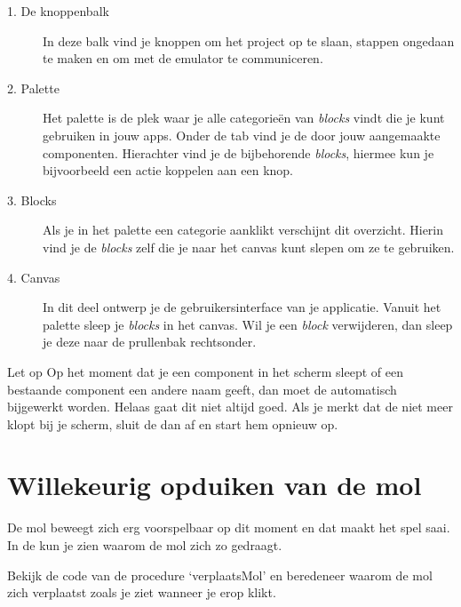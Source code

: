 \begin{description}
  \item[1. De knoppenbalk] In deze balk vind je knoppen om het project op te slaan, stappen ongedaan te maken en om met de emulator te communiceren.
  \item[2. Palette] Het palette is de plek waar je alle categorie\"en van \emph{blocks} vindt die je kunt gebruiken in jouw apps. Onder de tab  vind je de door jouw aangemaakte componenten. Hierachter vind je de bijbehorende \emph{blocks}, hiermee kun je bijvoorbeeld een actie koppelen aan een knop.
  \item[3. Blocks] Als je in het palette een categorie aanklikt verschijnt dit overzicht. Hierin vind je de \emph{blocks} zelf die je naar het canvas kunt slepen om ze te gebruiken.
  \item[4. Canvas] In dit deel ontwerp je de gebruikersinterface van je applicatie. Vanuit het palette sleep je \emph{blocks} in het canvas. Wil je een \emph{block} verwijderen, dan sleep je deze naar de prullenbak rechtsonder.
\end{description}

\pagebreak
\begin{derivation}{Let op}
Op het moment dat je een component in het  scherm sleept of een bestaande component een andere naam geeft, dan moet de  automatisch bijgewerkt worden. Helaas gaat dit niet altijd goed. Als je merkt dat de  niet meer klopt bij je  scherm, sluit de  dan af en start hem opnieuw op.
\end{derivation}

\section{Willekeurig opduiken van de mol}
De mol beweegt zich erg voorspelbaar op dit moment en dat maakt het spel saai. In de  kun je zien waarom de mol zich zo gedraagt.

\begin{opgave}
    \opgVraag
	Bekijk de code van de procedure `verplaatsMol' en beredeneer waarom de mol zich verplaatst 
	zoals je ziet wanneer je erop klikt. 
\end{opgave}

